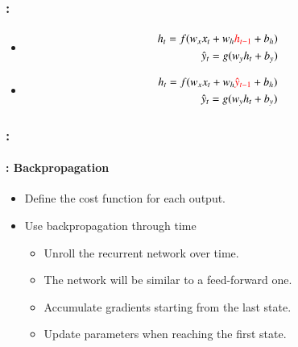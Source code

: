 \documentclass[xcolor=table]{beamer}
\begin{document}
\begin{frame}
	\frametitle{\insertshortsubtitle: \insertsection}
	\framesubtitle{\insertsubsection}
	
	\begin{minipage}{0.49\textwidth} 
		\begin{itemize}
			\item {}
			\begin{align*}
				h_t = f(w_x x_t + w_h \textcolor{red}{h_{t-1}} + b_h) \\
				\hat{y}_t = g(w_y h_t + b_y)
			\end{align*}
			\item {}
			\begin{align*}
				h_t = f(w_x x_t + w_h \textcolor{red}{\hat{y}_{t-1}} + b_h) \\
				\hat{y}_t = g(w_y h_t + b_y)
			\end{align*}
		\end{itemize}
	\end{minipage}
	\begin{minipage}{0.5\textwidth}
	\end{minipage}

\end{frame}

\begin{frame}
	\frametitle{\insertshortsubtitle: \insertsection}
	\framesubtitle{\insertsubsection: Backpropagation}
	
	\begin{itemize}
		\item Define the cost function for each output.
		\item Use backpropagation through time \cite{1990-werbos}
		\begin{itemize}
			\item Unroll the recurrent network over time.
			\item The network will be similar to a feed-forward one.
			\item Accumulate gradients starting from the last state.
			\item Update parameters when reaching the first state.
		\end{itemize}
	\end{itemize}

\end{frame}
\end{document}
